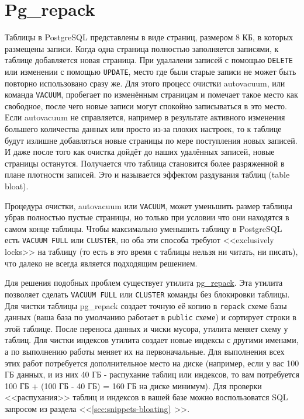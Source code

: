 \section{Pg\_repack}

Таблицы в PostgreSQL представлены в виде страниц, размером 8 КБ, в которых размещены записи. Когда одна страница полностью заполняется записями, к таблице добавляется новая страница. При удалалени записей с помощью \lstinline!DELETE! или изменении с помощью \lstinline!UPDATE!, место где были старые записи не может быть повторно использовано сразу же. Для этого процесс очистки autovacuum, или команда \lstinline!VACUUM!, пробегает по изменённым страницам и помечает такое место как свободное, после чего новые записи могут спокойно записываться в это место. Если autovacuum не справляется, например в результате активного изменения большего количества данных или просто из-за плохих настроек, то к таблице будут излишне добавляться новые страницы по мере поступления новых записей. И даже после того как очистка дойдёт до наших удалённых записей, новые страницы останутся. Получается что таблица становится более разряженной в плане плотности записей. Это и называется эффектом раздувания таблиц (table bloat).

Процедура очистки, autovacuum или \lstinline!VACUUM!, может уменьшить размер таблицы убрав полностью пустые страницы, но только при условии что они находятся в самом конце таблицы. Чтобы максимально уменьшить таблицу в PostgreSQL есть \lstinline!VACUUM FULL! или \lstinline!CLUSTER!, но оба эти способа требуют <<exclusively locks>> на таблицу (то есть в это время с таблицы нельзя ни читать, ни писать), что далеко не всегда является подходящим решением.

Для решения подобных проблем существует утилита \href{http://reorg.github.io/pg\_repack/}{pg\_repack}. Эта утилита позволяет сделать \lstinline!VACUUM FULL! или \lstinline!CLUSTER! команды без блокировки таблицы. Для чистки таблицы pg\_repack создает точную её копию в \lstinline!repack! схеме базы данных (ваша база по умолчанию работает в \lstinline!public! схеме) и сортирует строки в этой таблице. После переноса данных и чиски мусора, утилита меняет схему у таблиц. Для чистки индексов утилита создает новые индексы с другими именами, а по выполнению работы меняет их на первоначальные. Для выполнения всех этих работ потребуется дополнительное место на диске (например, если у вас 100 ГБ данных, и из них 40 ГБ - распухание таблиц или индексов, то вам потребуется 100 ГБ + (100 ГБ - 40 ГБ) = 160 ГБ на диске минимум). Для проверки <<распухания>> таблиц и индексов в вашей базе можно воспользоватся SQL запросом из раздела <<\ref{sec:snippets-bloating}~>>.

